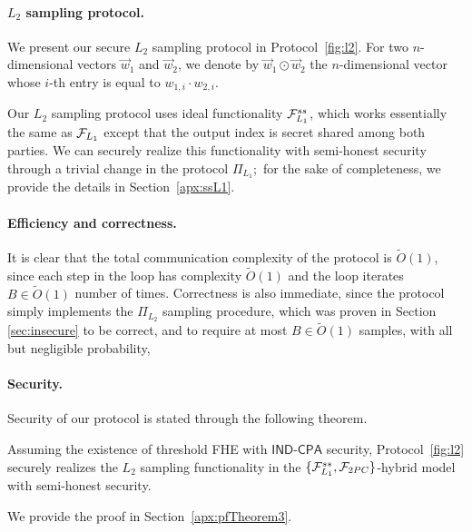 \paragraph{$L_2$ sampling protocol.}
We present our secure $L_2$ sampling protocol in
Protocol~\ref{fig:l2}.
For two $n$-dimensional vectors $\vec{w}_1$ and $\vec{w}_2$, we
denote by $\vec{w}_1 \odot \vec{w}_2$ the $n$-dimensional
vector whose $i$-th entry is equal to
$w_{1,i} \cdot w_{2,i}$.

Our $L_2$ sampling protocol uses ideal functionality $\mathcal{F}_{L_1}^{ss}$, which works essentially the same as $\mathcal{F}_{L_1}$ except that the output index is secret shared among both parties. We can securely realize this functionality with semi-honest security through a trivial change in the protocol $\Pi_{L_1}$;~for the sake of completeness, we provide the details in Section~\ref{apx:ssL1}.
 

\paragraph{Efficiency and correctness.}
It is clear that the total communication complexity of the protocol is $\tilde{O}(1)$, since each step in the loop has complexity $\tilde{O}(1)$ and the loop iterates $B \in \tilde{O}(1)$ number of times.
Correctness is also immediate, since the protocol simply implements the $\Pi_{L_2}$ sampling procedure, which was proven in Section \ref{sec:insecure} to be correct, and to require at most $B \in \tilde{O}(1)$ samples, with all but negligible probability,
 
 \paragraph{Security.} Security of our protocol is stated through the following theorem.
\begin{theorem}
\label{th:l2}
Assuming the existence of threshold FHE with
$\mathsf{IND}\mbox{-}\mathsf{CPA}$ security,
Protocol~\ref{fig:l2} securely realizes the $L_2$ sampling
functionality in
the $\{\mathcal{F}_{L_1}^{ss}, \mathcal{F}_{2PC}\}$-hybrid model with semi-honest security.
\end{theorem}
%
We provide the proof in Section~\ref{apx:pfTheorem3}.
